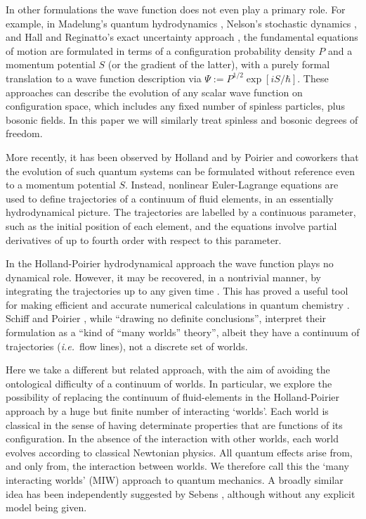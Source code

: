 \documentclass[12pt, aps,pra,amsmath,amssymb,superscriptaddress]{revtex4-2}
\newcommand{\ie}{{\em i.e.}}
\renewcommand{\(}{\left(}
\renewcommand{\)}{\right)}
\newcommand{\blk}{\color{black}}
\newcommand{\blu}{\color{blue}}
\renewcommand\blu{\blk}
\begin{document}
In other formulations the wave function does not even play a primary role.  For
example, in Madelung's quantum hydrodynamics \cite{madelung}, Nelson's
stochastic dynamics \cite{nelson}, and Hall and Reginatto's exact uncertainty
approach \cite{exact}, the fundamental equations of motion are formulated in
terms of a configuration probability density $P$ and a momentum potential $S$
(or the gradient of the latter), with a purely formal translation to a
wave function description via $\Psi:=P^{1/2}\exp[iS/\hbar]$. \blk These
approaches can describe the evolution of any scalar wave function on
configuration space, which includes any fixed number of spinless particles, plus
bosonic fields.   In this paper we will similarly
treat spinless and bosonic degrees of freedom. \blk 

More recently, it has  been observed by Holland \cite{holland} and by Poirier and
coworkers \cite{poirier, parlant,schiff} that \blk the evolution of  such \blk
quantum systems 
can be formulated without reference
even to a momentum potential $S$.  Instead, nonlinear Euler-Lagrange equations
are used to define trajectories of a continuum of fluid elements, in an
essentially hydrodynamical picture.  The trajectories are labelled by a
continuous parameter, such as the initial position of each element, and the
equations involve partial derivatives of up to fourth order with respect to this
parameter. 

In the Holland-Poirier \blk hydrodynamical \blk approach the wave function plays
no dynamical role.  However, it may be recovered, in a nontrivial manner, by
integrating the trajectories up to any given time \cite{holland}.  This has
proved a useful tool for making efficient and accurate numerical calculations in
quantum chemistry \cite{poirier,parlant}.  \blk Schiff and Poirier
\cite{schiff}, while ``drawing no definite conclusions'', interpret their
formulation as a ``kind of ``many worlds'' theory'', albeit they have a
continuum of trajectories (\ie~flow lines), not a discrete set of worlds. \blk 

Here we take a different \blk but related \blk approach, with the aim of
avoiding the ontological difficulty of a continuum of worlds.  In particular, we
explore the possibility of replacing the continuum of fluid-elements
in the Holland-Poirier approach by a \blk huge \blk but
finite number of interacting \blk `worlds'.  Each world is classical in the
sense  \blu of having \blk determinate properties \blu that \blk are functions of its
configuration.
In the absence of the interaction with
other worlds, each world evolves according to classical Newtonian physics.  All
quantum effects arise from, and only from, the interaction between worlds. We
therefore call this the `many interacting worlds' (MIW) approach to quantum
mechanics.  A broadly similar idea has been independently suggested by Sebens
\cite{sebens}, although without any explicit model being given.
\end{document}
